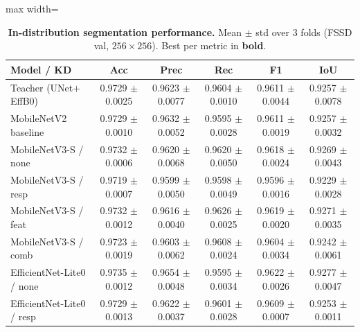 \begin{table}[ht]
\centering
\caption{\textbf{In-distribution segmentation performance.} Mean $\pm$ std over 3 folds (FSSD val, $256{\times}256$). Best per metric in \textbf{bold}.}
\label{tab:t2-segmentation}
\small
\setlength{\tabcolsep}{4pt}
\begin{adjustbox}{max width=\textwidth}
\begin{tabular}{lccccc}
\toprule
\textbf{Model / KD}                & \textbf{Acc}             & \textbf{Prec}            & \textbf{Rec}             & \textbf{F1}              & \textbf{IoU}             \\
\midrule
Teacher (UNet$+$EffB0)             & 0.9729 $\pm$ 0.0025      & 0.9623 $\pm$ 0.0077      & 0.9604 $\pm$ 0.0010      & 0.9611 $\pm$ 0.0044      & 0.9257 $\pm$ 0.0078      \\
MobileNetV2 baseline               & 0.9729 $\pm$ 0.0010      & 0.9632 $\pm$ 0.0052      & 0.9595 $\pm$ 0.0028      & 0.9611 $\pm$ 0.0019      & 0.9257 $\pm$ 0.0032      \\
\midrule
MobileNetV3-S / none               & 0.9732 $\pm$ 0.0006      & 0.9620 $\pm$ 0.0068      & 0.9620 $\pm$ 0.0050      & 0.9618 $\pm$ 0.0024      & 0.9269 $\pm$ 0.0043      \\
MobileNetV3-S / resp               & 0.9719 $\pm$ 0.0007      & 0.9599 $\pm$ 0.0050      & 0.9598 $\pm$ 0.0049      & 0.9596 $\pm$ 0.0016      & 0.9229 $\pm$ 0.0028      \\
MobileNetV3-S / feat               & 0.9732 $\pm$ 0.0012      & 0.9616 $\pm$ 0.0040      & 0.9626 $\pm$ 0.0025      & 0.9619 $\pm$ 0.0020      & 0.9271 $\pm$ 0.0035      \\
MobileNetV3-S / comb               & 0.9723 $\pm$ 0.0019      & 0.9603 $\pm$ 0.0062      & 0.9608 $\pm$ 0.0024      & 0.9604 $\pm$ 0.0034      & 0.9242 $\pm$ 0.0061      \\
\midrule
EfficientNet-Lite0 / none          & 0.9735 $\pm$ 0.0012      & 0.9654 $\pm$ 0.0048      & 0.9595 $\pm$ 0.0034      & 0.9622 $\pm$ 0.0026      & 0.9277 $\pm$ 0.0047      \\
EfficientNet-Lite0 / resp          & 0.9729 $\pm$ 0.0013      & 0.9622 $\pm$ 0.0037      & 0.9601 $\pm$ 0.0028      & 0.9609 $\pm$ 0.0007      & 0.9253 $\pm$ 0.0011      \\

\end{tabular}
\end{adjustbox}
\end{table}
